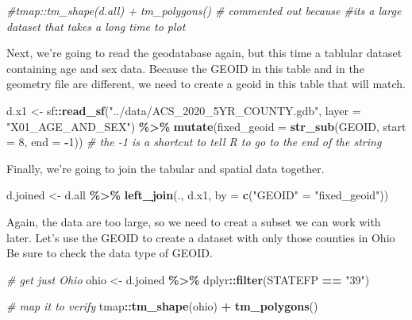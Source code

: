 \documentclass[]{article}
\newenvironment{Shaded}{\begin{snugshade}}{\end{snugshade}}
\newcommand{\AttributeTok}[1]{\textcolor[rgb]{0.13,0.29,0.53}{#1}}
\newcommand{\CommentTok}[1]{\textcolor[rgb]{0.56,0.35,0.01}{\textit{#1}}}
\newcommand{\DecValTok}[1]{\textcolor[rgb]{0.00,0.00,0.81}{#1}}
\newcommand{\FunctionTok}[1]{\textcolor[rgb]{0.13,0.29,0.53}{\textbf{#1}}}
\newcommand{\NormalTok}[1]{#1}
\newcommand{\OtherTok}[1]{\textcolor[rgb]{0.56,0.35,0.01}{#1}}
\newcommand{\SpecialCharTok}[1]{\textcolor[rgb]{0.81,0.36,0.00}{\textbf{#1}}}
\newcommand{\StringTok}[1]{\textcolor[rgb]{0.31,0.60,0.02}{#1}}
\begin{document}
\begin{Shaded}
\begin{Highlighting}[]
\CommentTok{\#tmap::tm\_shape(d.all) + tm\_polygons() \# commented out because }
\CommentTok{\#it\textquotesingle{}s a large dataset that takes a long time to plot}
\end{Highlighting}
\end{Shaded}

Next, we're going to read the geodatabase again, but this time a
tablular dataset containing age and sex data. Because the GEOID in this
table and in the geometry file are different, we need to create a geoid
in this table that will match.

\begin{Shaded}
\begin{Highlighting}[]
\NormalTok{d.x1 }\OtherTok{\textless{}{-}}\NormalTok{ sf}\SpecialCharTok{::}\FunctionTok{read\_sf}\NormalTok{(}\StringTok{"../data/ACS\_2020\_5YR\_COUNTY.gdb"}\NormalTok{, }\AttributeTok{layer =} \StringTok{"X01\_AGE\_AND\_SEX"}\NormalTok{) }\SpecialCharTok{\%\textgreater{}\%}
  \FunctionTok{mutate}\NormalTok{(}\AttributeTok{fixed\_geoid =} \FunctionTok{str\_sub}\NormalTok{(GEOID, }\AttributeTok{start =} \DecValTok{8}\NormalTok{, }\AttributeTok{end =} \SpecialCharTok{{-}}\DecValTok{1}\NormalTok{)) }
\CommentTok{\# the {-}1 is a shortcut to tell R to go to the end of the string}
\end{Highlighting}
\end{Shaded}

Finally, we're going to join the tabular and spatial data together.

\begin{Shaded}
\begin{Highlighting}[]
\NormalTok{d.joined }\OtherTok{\textless{}{-}}\NormalTok{ d.all }\SpecialCharTok{\%\textgreater{}\%} \FunctionTok{left\_join}\NormalTok{(., d.x1, }\AttributeTok{by =} \FunctionTok{c}\NormalTok{(}\StringTok{"GEOID"} \OtherTok{=} \StringTok{"fixed\_geoid"}\NormalTok{))}
\end{Highlighting}
\end{Shaded}

Again, the data are too large, so we need to creat a subset we can work
with later. Let's use the GEOID to create a dataset with only those
counties in Ohio Be sure to check the data type of GEOID.

\begin{Shaded}
\begin{Highlighting}[]
\CommentTok{\# get just Ohio}
\NormalTok{ohio }\OtherTok{\textless{}{-}}\NormalTok{ d.joined }\SpecialCharTok{\%\textgreater{}\%}\NormalTok{ dplyr}\SpecialCharTok{::}\FunctionTok{filter}\NormalTok{(STATEFP }\SpecialCharTok{==} \StringTok{"39"}\NormalTok{)}


\CommentTok{\# map it to verify}
\NormalTok{tmap}\SpecialCharTok{::}\FunctionTok{tm\_shape}\NormalTok{(ohio) }\SpecialCharTok{+} \FunctionTok{tm\_polygons}\NormalTok{()}
\end{Highlighting}
\end{Shaded}
\end{document}
